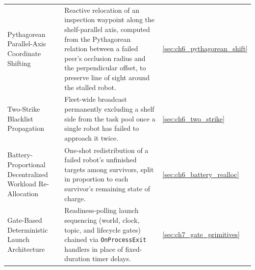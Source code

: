 \begin{longtable}{@{}p{}p{}p{}@{}}
Pythagorean Parallel-Axis Coordinate Shifting & Reactive relocation of an inspection waypoint along the shelf-parallel axis, computed from the Pythagorean relation between a failed peer's occlusion radius and the perpendicular offset, to preserve line of sight around the stalled robot. & \autoref{sec:ch6_pythagorean_shift} \\
Two-Strike Blacklist Propagation & Fleet-wide broadcast permanently excluding a shelf side from the task pool once a single robot has failed to approach it twice. & \autoref{sec:ch6_two_strike} \\
Battery-Proportional Decentralized Workload Re-Allocation & One-shot redistribution of a failed robot's unfinished targets among survivors, split in proportion to each survivor's remaining state of charge. & \autoref{sec:ch6_battery_realloc} \\
Gate-Based Deterministic Launch Architecture & Readiness-polling launch sequencing (world, clock, topic, and lifecycle gates) chained via \texttt{OnProcessExit} handlers in place of fixed-duration timer delays. & \autoref{sec:ch7_gate_primitives} \\

\end{longtable}

